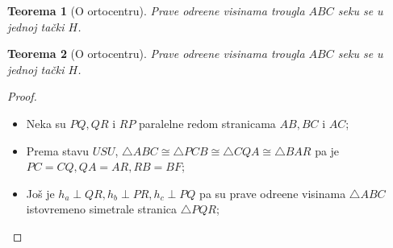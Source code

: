 \documentclass{beamer}
\newtheorem{teorema}{{Teorema}}[section]
\theoremstyle{definition}
\begin{document}
\begin{frame}
\begin{teorema}[O ortocentru]
Prave odre\dj{}ene visinama trougla $ABC$ seku se u jednoj ta\v{c}ki $H$.
\end{teorema}
\pause
\begin{center}
			\resizebox{2.5in}{!}{}
		\end{center}
	
\end{frame}

\begin{frame}
\begin{teorema}[O ortocentru]
Prave odre\dj{}ene visinama trougla $ABC$ seku se u jednoj ta\v{c}ki $H$.
\end{teorema}

\begin{center}

		\end{center}
		
		\begin{proof}
			\begin{itemize}
				\item<1-> Neka su $PQ, QR$ i $RP$ paralelne redom stranicama $AB,BC$ i $AC$;
				\item<2-> Prema stavu $USU$, $\bigtriangleup ABC\cong\bigtriangleup PCB\cong\bigtriangleup CQA \cong\bigtriangleup BAR$ pa je $PC=CQ, QA=AR, RB=BF$;
				\item<3-> Jo\v{s} je $h_a \perp QR,h_b \perp PR, h_c \perp PQ$ pa su prave odre\dj{}ene visinama $\bigtriangleup ABC$ istovremeno simetrale stranica $\bigtriangleup PQR$;

			\end{itemize}
		\end{proof}
		
\end{frame}
\end{document}
